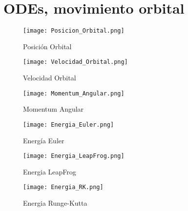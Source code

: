 \documentclass{article} %
\begin{document}
\section{ODEs, movimiento orbital}
\begin{figure}[H]
    \centering
    \texttt{[image: Posicion\_Orbital.png]}
    \caption{Posición Orbital}
    \label{fig:Posicion_Orbital}
\end{figure}
\begin{figure}[H]
    \centering
    \texttt{[image: Velocidad\_Orbital.png]}
    \caption{Velocidad Orbital}
    \label{fig:Velocidad_Orbital}
\end{figure}
\begin{figure}[H]
    \centering
    \texttt{[image: Momentum\_Angular.png]}
    \caption{Momentum Angular}
    \label{fig:Momentum_Angular}
\end{figure}
\begin{figure}[H]
    \centering
    \texttt{[image: Energia\_Euler.png]}
    \caption{Energía Euler}
    \label{fig:Energia_Euler}
\end{figure}
\begin{figure}[H]
    \centering
    \texttt{[image: Energia\_LeapFrog.png]}
    \caption{Energia LeapFrog}
    \label{fig:Energia_LeapFrog}
\end{figure}
\begin{figure}[H]
    \centering
    \texttt{[image: Energia\_RK.png]}
    \caption{Energia Runge-Kutta}
    \label{fig:Energia_RK}
\end{figure}
\end{document}
